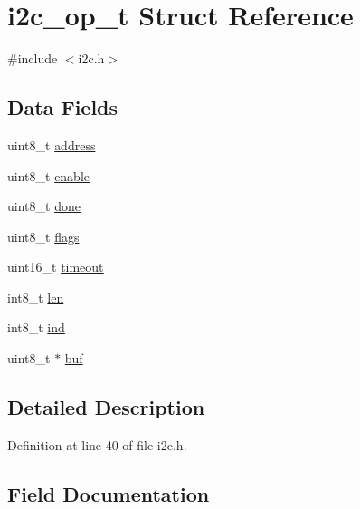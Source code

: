 \hypertarget{structi2c__op__t}{}\section{i2c\+\_\+op\+\_\+t Struct Reference}
\label{structi2c__op__t}


{\ttfamily \#include $<$i2c.\+h$>$}

\subsection*{Data Fields}
\begin{DoxyCompactItemize}
\item 
uint8\+\_\+t \hyperlink{structi2c__op__t_a0f8493e5b2b5a8a3437001068944b3c8}{address}
\item 
uint8\+\_\+t \hyperlink{structi2c__op__t_a482a75434d75a91f2c3b4c8f37dbe201}{enable}
\item 
uint8\+\_\+t \hyperlink{structi2c__op__t_a281b1e75543e100e4bac1f48d35ecd91}{done}
\item 
uint8\+\_\+t \hyperlink{structi2c__op__t_a99ce5c1c16cf8a7b8293f5b96ac74c27}{flags}
\item 
uint16\+\_\+t \hyperlink{structi2c__op__t_a1b20cc2c470b03ecc097a1cd792bbffb}{timeout}
\item 
int8\+\_\+t \hyperlink{structi2c__op__t_ac7d21b50f84a0d18d28ad36987c9e56a}{len}
\item 
int8\+\_\+t \hyperlink{structi2c__op__t_a628b6ac83f7303b4dab9a9d86b6167a0}{ind}
\item 
uint8\+\_\+t $\ast$ \hyperlink{structi2c__op__t_a1b38c7b78966e4464cfb858f223bf89a}{buf}
\end{DoxyCompactItemize}


\subsection{Detailed Description}


Definition at line 40 of file i2c.\+h.



\subsection{Field Documentation}
\mbox{\label{structi2c__op__t_a0f8493e5b2b5a8a3437001068944b3c8}} 
